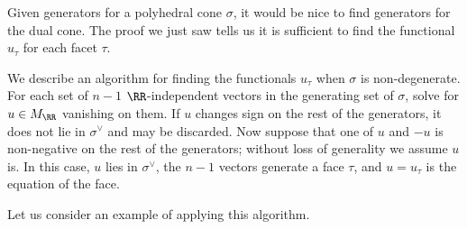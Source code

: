 \documentclass[12pt]{amsart}
\theoremstyle{plain}
\theoremstyle{definition}
\begin{document}
Given generators for a polyhedral cone $\sigma$, it would be nice to find generators for the dual cone.
The proof we just saw tells us it is sufficient to find the functional $u_\tau$ for each facet $\tau$.

We describe an algorithm for finding the functionals $u_\tau$ when $\sigma$ is non-degenerate.
For each set of $n-1$ $\RR$-independent vectors in the generating set of $\sigma$, solve for $u \in M_\RR$ vanishing on them.
If $u$ changes sign on the rest of the generators, it does not lie in $\sigma^\vee$ and may be discarded.
Now suppose that one of $u$ and $-u$ is non-negative on the rest of the generators; without loss of generality we assume $u$ is.
In this case, $u$ lies in $\sigma^\vee$, the $n-1$ vectors generate a face $\tau$, and $u = u_\tau$ is the equation of the face.

Let us consider an example of applying this algorithm.
\end{document}
